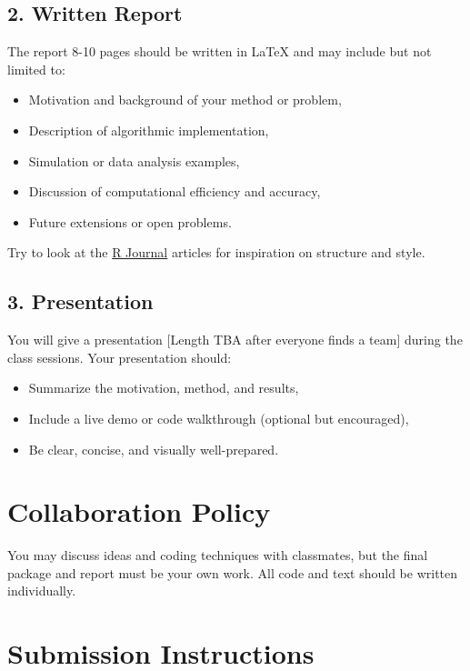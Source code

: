 \documentclass[
  letterpaper,
  DIV=11,
  numbers=noendperiod]{scrreprt}
\providecommand{\tightlist}{%
  \setlength{\itemsep}{0pt}\setlength{\parskip}{0pt}}
\begin{document}
\subsection{2. Written Report}\label{written-report}

The report 8-10 pages should be written in LaTeX and may include but not
limited to:

\begin{itemize}
\tightlist
\item
  Motivation and background of your method or problem,
\item
  Description of algorithmic implementation,
\item
  Simulation or data analysis examples,
\item
  Discussion of computational efficiency and accuracy,
\item
  Future extensions or open problems.
\end{itemize}

Try to look at the \href{https://journal.r-project.org/}{R Journal}
articles for inspiration on structure and style.

\subsection{3. Presentation}\label{presentation}

You will give a presentation {[}Length TBA after everyone finds a
team{]} during the class sessions. Your presentation should:

\begin{itemize}
\tightlist
\item
  Summarize the motivation, method, and results,
\item
  Include a live demo or code walkthrough (optional but encouraged),
\item
  Be clear, concise, and visually well-prepared.
\end{itemize}

\section{Collaboration Policy}\label{collaboration-policy}

You may discuss ideas and coding techniques with classmates, but the
final package and report must be your own work. All code and text should
be written individually.

\section{Submission Instructions}\label{submission-instructions}
\end{document}
